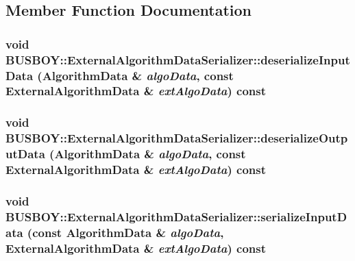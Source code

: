 \subsection{Member Function Documentation}
\hypertarget{classBUSBOY_1_1ExternalAlgorithmDataSerializer_af9af42b4d74c605c6da878ddc9f85316}{
\subsubsection[{deserializeInputData}]{\setlength{\rightskip}{0pt plus 5cm}void BUSBOY::ExternalAlgorithmDataSerializer::deserializeInputData ({\bf AlgorithmData} \& {\em algoData}, \/  const {\bf ExternalAlgorithmData} \& {\em extAlgoData}) const}}
\label{classBUSBOY_1_1ExternalAlgorithmDataSerializer_af9af42b4d74c605c6da878ddc9f85316}
\hypertarget{classBUSBOY_1_1ExternalAlgorithmDataSerializer_abea197e5350829e1be632e044bc451a0}{
\subsubsection[{deserializeOutputData}]{\setlength{\rightskip}{0pt plus 5cm}void BUSBOY::ExternalAlgorithmDataSerializer::deserializeOutputData ({\bf AlgorithmData} \& {\em algoData}, \/  const {\bf ExternalAlgorithmData} \& {\em extAlgoData}) const}}
\label{classBUSBOY_1_1ExternalAlgorithmDataSerializer_abea197e5350829e1be632e044bc451a0}
\hypertarget{classBUSBOY_1_1ExternalAlgorithmDataSerializer_a382032041e694cb53c8fe03c5c8dff80}{
\subsubsection[{serializeInputData}]{\setlength{\rightskip}{0pt plus 5cm}void BUSBOY::ExternalAlgorithmDataSerializer::serializeInputData (const {\bf AlgorithmData} \& {\em algoData}, \/  {\bf ExternalAlgorithmData} \& {\em extAlgoData}) const}}
